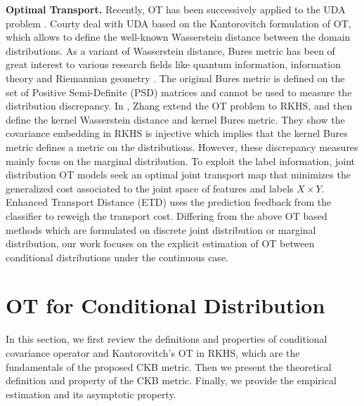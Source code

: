 \documentclass[final]{cvpr}
\begin{document}
\textbf{Optimal Transport.} Recently, OT has been successively applied to the UDA problem \cite{bhushan2018deepjdot,courty2017joint,courty2016optimal,li2020Enhanced,zhang2019optimal}. Courty \etal \cite{courty2016optimal} deal with UDA based on the Kantorovitch formulation of OT, which allows to define the well-known Wasserstein distance between the domain distributions. As a variant of Wasserstein distance, Bures metric has been of great interest to various research fields like quantum information, information theory and Riemannian geometry \cite{bhatia2019bures}. The original Bures metric is defined on the set of Positive Semi-Definite (PSD) matrices and cannot be used to measure the distribution discrepancy. In \cite{zhang2019optimal}, Zhang \etal extend the OT problem to RKHS, and then define the kernel Wasserstein distance and kernel Bures metric. They show the covariance embedding in RKHS is injective which implies that the kernel Bures metric defines a metric on the distributions. However, these discrepancy measures mainly focus on the marginal distribution. To exploit the label information, joint distribution OT models \cite{bhushan2018deepjdot,courty2017joint} seek an optimal joint transport map that minimizes the generalized cost associated to the joint space of features and labels $X\times Y$. Enhanced Transport Distance (ETD) \cite{li2020Enhanced} uses the prediction feedback from the classifier to reweigh the transport cost. Differing from the above OT based methods which are formulated on discrete joint distribution or marginal distribution, our work focuses on the explicit estimation of OT between conditional distributions under the continuous case.




\section{OT for Conditional Distribution}
In this section, we first review the definitions and properties of conditional covariance operator and Kantorovitch's OT in RKHS, which are the fundamentals of the proposed CKB metric. Then we present the theoretical definition and property of the CKB metric. Finally, we provide the empirical estimation and its asymptotic property.
\end{document}
